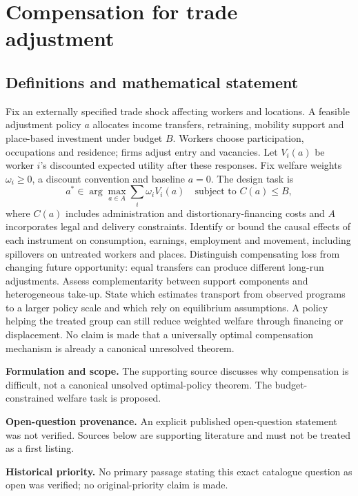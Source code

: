 \documentclass[11pt]{article}
\begin{document}
\section*{Compensation for trade adjustment}\label{30007623}
\subsection{Definitions and mathematical statement}
Fix an externally specified trade shock affecting workers and locations. A feasible adjustment policy \(a\) allocates income transfers, retraining, mobility support and place-based investment under budget \(B\). Workers choose participation, occupations and residence; firms adjust entry and vacancies. Let \(V_i(a)\) be worker \(i\)'s discounted expected utility after these responses. Fix welfare weights \(\omega_i\geq0\), a discount convention and baseline \(a=0\). The design task is
\[a^*\in\arg\max_{a\in A}\sum_i\omega_iV_i(a)\quad\text{subject to }C(a)\leq B,\]
where \(C(a)\) includes administration and distortionary-financing costs and \(A\) incorporates legal and delivery constraints. Identify or bound the causal effects of each instrument on consumption, earnings, employment and movement, including spillovers on untreated workers and places. Distinguish compensating loss from changing future opportunity: equal transfers can produce different long-run adjustments. Assess complementarity between support components and heterogeneous take-up. State which estimates transport from observed programs to a larger policy scale and which rely on equilibrium assumptions. A policy helping the treated group can still reduce weighted welfare through financing or displacement. No claim is made that a universally optimal compensation mechanism is already a canonical unresolved theorem.

\par\textbf{Formulation and scope.} The supporting source discusses why compensation is difficult, not a canonical unsolved optimal-policy theorem. The budget-constrained welfare task is proposed.

\par\textbf{Open-question provenance.} An explicit published open-question statement was not verified. Sources below are supporting literature and must not be treated as a first listing.

\par\textbf{Historical priority.} No primary passage stating this exact catalogue question as open was verified; no original-priority claim is made.
\end{document}
